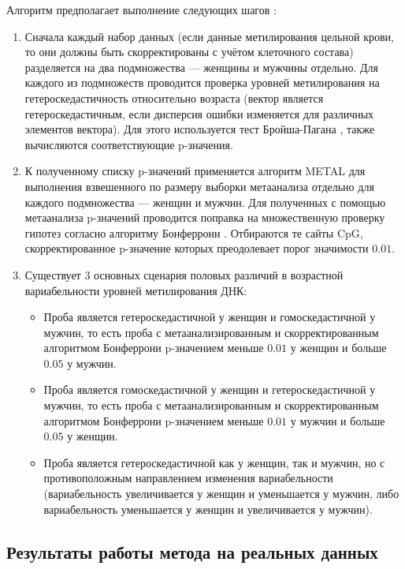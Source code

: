 Алгоритм предполагает выполнение следующих шагов \autocite{Yusipov2020}:
\begin{enumerate}
	\item Сначала каждый набор данных (если данные метилирования цельной крови, то они должны быть скорректированы с учётом клеточного состава) разделяется на два подмножества --- женщины и мужчины отдельно. Для каждого из подмножеств проводится проверка уровней метилирования на гетероскедастичность относительно возраста (вектор является гетероскедастичным, если дисперсия ошибки изменяется для различных элементов вектора). Для этого используется тест Бройша-Пагана \autocite{Breusch1979, COOK1983}, также вычисляются соответствующие p-значения.
	\item К полученному списку p-значений применяется алгоритм METAL \autocite{Willer2010} для выполнения взвешенного по размеру выборки метаанализа отдельно для каждого подмножества --- женщин и мужчин. Для полученных с помощью метаанализа p-значений проводится поправка на множественную проверку гипотез согласно алгоритму Бонферрони \autocite{bonferroni1936teoria}. Отбираются те сайты CpG, скорректированное p-значение которых преодолевает порог значимости $0.01$.
	\item Существует 3 основных сценария половых различий в возрастной вариабельности уровней метилирования ДНК:
	\begin{itemize}
		\item Проба является гетероскедастичной у женщин и гомоскедастичной у мужчин, то есть проба с метаанализированным и скорректированным алгоритмом Бонферрони p-значением меньше $0.01$ у женщин и больше $0.05$ у мужчин.  
		\item Проба является гомоскедастичной у женщин и гетероскедастичной у мужчин, то есть проба с метаанализированным и скорректированным алгоритмом Бонферрони p-значением меньше $0.01$ у мужчин и больше $0.05$ у женщин.
		\item Проба является гетероскедастичной как у женщин, так и мужчин, но с противоположным направлением изменения вариабельности (вариабельность увеличивается у женщин и уменьшается у мужчин, либо вариабельность уменьшается у женщин и увеличивается у мужчин).
	\end{itemize}
\end{enumerate}

\subsection{Результаты работы метода на реальных данных}\label{subsec:ch2/sec3/subsec2}

